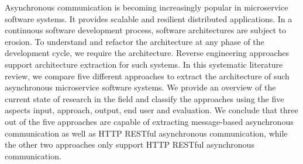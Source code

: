 
Asynchronous communication is becoming increasingly popular in microservice software systems.
It provides scalable and resilient distributed applications.
In a continuous software development process, software architectures are subject to erosion.
To understand and refactor the architecture at any phase of the development cycle, we require the architecture.
Reverse engineering approaches support architecture extraction for such systems.
In this systematic literature review, we compare five different approaches to extract the architecture of such asynchronous microservice software systems.
We provide an overview of the current state of research in the field and classify the approaches using the five aspects input, approach, output, end user and evaluation.
We conclude that three out of the five approaches are capable of extracting message-based asynchronous communication as well as HTTP RESTful asynchronous communication, while the other two approaches only support HTTP RESTful asynchronous communication.